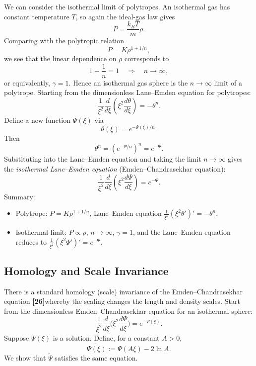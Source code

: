 \documentclass[12pt,a4paper]{article}
\numberwithin{equation}{section}
\begin{document}
We can consider the isothermal limit of polytropes. An isothermal gas has constant temperature $T$, so again the ideal-gas law gives
\begin{equation}
P = \frac{k_B T}{m} \rho.
\end{equation}
Comparing with the polytropic relation
\begin{equation}
P = K \rho^{1 + 1/n},
\end{equation}
we see that the linear dependence on $\rho$ corresponds to
\begin{equation}
1 + \frac{1}{n} = 1 \quad \Rightarrow \quad n \to \infty,
\end{equation}
or equivalently, $\gamma = 1$. Hence an isothermal gas sphere is the $n \to \infty$ limit of a polytrope. Starting from the dimensionless Lane--Emden equation for polytropes:
\begin{equation}
\frac{1}{\xi^2} \frac{d}{d\xi}\left(\xi^2 \frac{d\theta}{d\xi}\right) = - \theta^n.
\end{equation}
Define a new function $\Psi(\xi)$ via
\begin{equation}
\theta(\xi) = e^{-\Psi(\xi)/n}.
\end{equation}
Then
\begin{equation}
\theta^n = \left(e^{-\Psi/n}\right)^n = e^{-\Psi}.
\end{equation}
Substituting into the Lane--Emden equation and taking the limit $n \to \infty$ gives the \emph{isothermal Lane--Emden equation} (Emden--Chandrasekhar equation):
\begin{equation}
\frac{1}{\xi^2} \frac{d}{d\xi} \left( \xi^2 \frac{d\Psi}{d\xi} \right) = e^{-\Psi}.
\end{equation}
Summary:
\begin{itemize}
    \item Polytrope: $P = K \rho^{1 + 1/n}$, Lane--Emden equation $\frac{1}{\xi^2} (\xi^2 \theta')' = - \theta^n$.
    \item Isothermal limit: $P \propto \rho$, $n \to \infty$, $\gamma = 1$, and the Lane--Emden equation reduces to $\frac{1}{\xi^2} (\xi^2 \Psi')' = e^{-\Psi}$.
\end{itemize}


\subsection{Homology and Scale Invariance}
There is a standard homology (scale) invariance of the Emden–Chandrasekhar equation \textbf{[26]}whereby the scaling changes the length and density scales.
Start from the dimensionless Emden–Chandrasekhar equation for an isothermal sphere:
\begin{equation}
\frac{1}{\xi^{2}}\frac{d}{d\xi}\!\Big(\xi^{2}\frac{d\Psi}{d\xi}\Big)=e^{-\Psi(\xi)}.
\end{equation}
Suppose \(\Psi(\xi)\) is a solution. Define, for a constant \(A>0\),
\begin{equation}
\widetilde{\Psi(\xi)}:=\Psi(A\xi)-2\ln A.
\end{equation}
We show that \(\widetilde{\Psi}\) satisfies the same equation.
\end{document}
